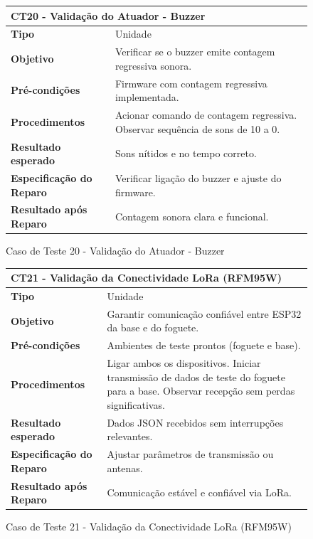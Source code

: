 \begin{figure}[H]
    \centering
\begin{longtable}{|p{}|p{}|}
\hline
\multicolumn{2}{|l|}{\textbf{CT20 - Validação do Atuador - Buzzer}} \\
\hline
\textbf{Tipo} & Unidade \\
\hline
\textbf{Objetivo} & Verificar se o buzzer emite contagem regressiva sonora. \\
\hline
\textbf{Pré-condições} & Firmware com contagem regressiva implementada. \\
\hline
\textbf{Procedimentos} &  Acionar comando de contagem regressiva.  Observar sequência de sons de 10 a 0.  \\
\hline
\textbf{Resultado esperado} & Sons nítidos e no tempo correto. \\
\hline
\textbf{Especificação do Reparo} & Verificar ligação do buzzer e ajuste do firmware. \\
\hline
\textbf{Resultado após Reparo} & Contagem sonora clara e funcional. \\
\hline
\end{longtable}
\caption{Caso de Teste 20 - Validação do Atuador - Buzzer}
\label{fig_ct20_validacao_atuador_buzzer}
\end{figure}

\begin{figure}[H]
    \centering
\begin{longtable}{|p{}|p{}|}
\hline
\multicolumn{2}{|l|}{\textbf{CT21 - Validação da Conectividade LoRa (RFM95W)}} \\
\hline
\textbf{Tipo} & Unidade \\
\hline
\textbf{Objetivo} & Garantir comunicação confiável entre ESP32 da base e do foguete. \\
\hline
\textbf{Pré-condições} & Ambientes de teste prontos (foguete e base). \\
\hline
\textbf{Procedimentos} &  Ligar ambos os dispositivos.  Iniciar transmissão de dados de teste do foguete para a base.  Observar recepção sem perdas significativas.  \\
\hline
\textbf{Resultado esperado} & Dados JSON recebidos sem interrupções relevantes. \\
\hline
\textbf{Especificação do Reparo} & Ajustar parâmetros de transmissão ou antenas. \\
\hline
\textbf{Resultado após Reparo} & Comunicação estável e confiável via LoRa. \\
\hline
\end{longtable}
\caption{Caso de Teste 21 - Validação da Conectividade LoRa (RFM95W)}
\label{fig_ct21_validacao_conectividade_lora}
\end{figure}

